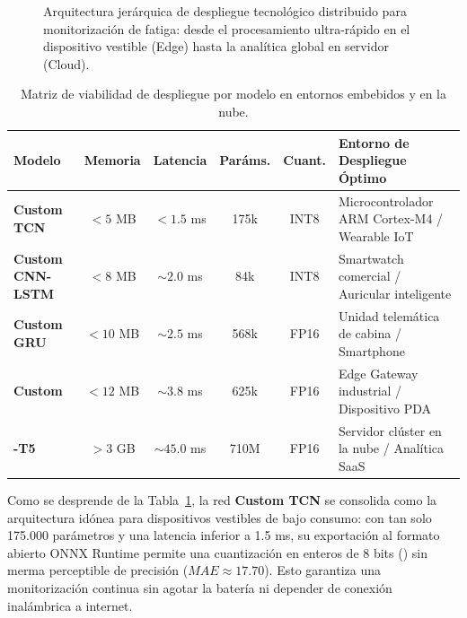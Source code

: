 \begin{figure}[H]
    \caption{Arquitectura jerárquica de despliegue tecnológico distribuido para monitorización de fatiga: desde el procesamiento ultra-rápido en el dispositivo vestible (Edge) hasta la analítica global en servidor (Cloud).}
    \label{fig:arquitectura_edge_cloud}
\end{figure}

\begin{table}[htbp]
\centering
\caption{Matriz de viabilidad de despliegue por modelo en entornos embebidos y en la nube.}
\label{tab:despliegue_modelos}
\small
\begin{tabularx}{\linewidth}{@{}p{2.8cm}cccc>{\raggedright\arraybackslash}X@{}}
\toprule
\textbf{Modelo} & \textbf{Memoria} & \textbf{Latencia} & \textbf{Paráms.} & \textbf{Cuant.} & \textbf{Entorno de Despliegue Óptimo} \\
\midrule
\textbf{Custom TCN} & $<5$ MB & $<1.5$ ms & 175k & INT8 & Microcontrolador ARM Cortex-M4 / Wearable IoT \\
\textbf{Custom CNN-LSTM} & $<8$ MB & $\sim 2.0$ ms & 84k & INT8 & Smartwatch comercial / Auricular inteligente \\
\textbf{Custom GRU} & $<10$ MB & $\sim 2.5$ ms & 568k & FP16 & Unidad telemática de cabina / Smartphone \\
\textbf{Custom \slstm{}} & $<12$ MB & $\sim 3.8$ ms & 625k & FP16 & Edge Gateway industrial / Dispositivo PDA \\
\textbf{\chronos{}-T5} & $>3$ GB & $\sim 45.0$ ms & 710M & FP16 & Servidor clúster en la nube / Analítica SaaS \\
\bottomrule
\end{tabularx}
\end{table}

Como se desprende de la Tabla~\ref{tab:despliegue_modelos}, la red \textbf{Custom TCN} se consolida como la arquitectura idónea para dispositivos vestibles de bajo consumo: con tan solo 175.000 parámetros y una latencia inferior a 1.5 ms, su exportación al formato abierto ONNX Runtime permite una cuantización en enteros de 8 bits () sin merma perceptible de precisión ($MAE \approx 17.70$). Esto garantiza una monitorización continua sin agotar la batería ni depender de conexión inalámbrica a internet.

